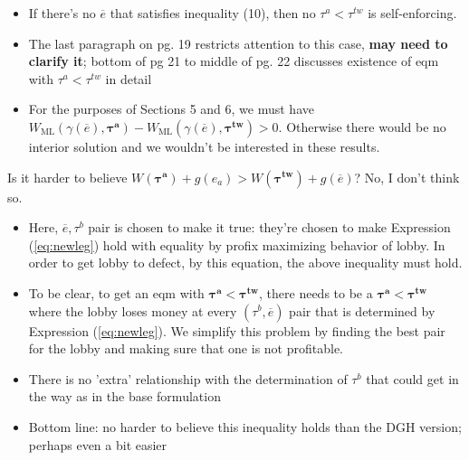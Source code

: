 \documentclass[12pt]{article}
\newcommand{\ov}{\overline}
\newcommand{\bta}{\bm{\tau^a}}
\newcommand{\btw}{\bm{\tau^{tw}}}
\newcommand{\ga}{\gamma}
\begin{document}
\begin{itemize}
\begin{itemize}
\begin{itemize}
					\item If there's no $\ov{e}$ that satisfies inequality (10), then no $\tau^a < \tau^{tw}$ is self-enforcing.
					\item The last paragraph on pg. 19 restricts attention to this case, \textbf{may need to clarify it}; bottom of pg 21 to middle of pg. 22 discusses existence of eqm with $\tau^a < \tau^{tw}$ in detail
					\item For the purposes of Sections 5 and 6, we must have $W_\text{ML}(\ga(\ov{e}),\bta) - W_\text{ML}(\ga(\ov{e}),\btw) > 0$. Otherwise there would be no interior solution and we wouldn't be interested in these results.
				\end{itemize}
			Is it harder to believe $W(\bta) +g(e_a) > W(\btw) + g(\ov{e})$? No, I don't think so.
				\begin{itemize}
					\item Here, $\ov{e}, \tau^b$ pair is chosen to make it true: they're chosen to make Expression (\ref{eq:newleg}) hold with equality by profix maximizing behavior of lobby. In order to get lobby to defect, by this equation, the above inequality must hold.
					\item To be clear, to get an eqm with $\bta < \btw$, there needs to be a $\bta < \btw$ where the lobby loses money at every $\left(\tau^b,\ov{e}\right)$ pair that is determined by Expression (\ref{eq:newleg}). We simplify this problem by finding the best pair for the lobby and making sure that one is not profitable.
					\item There is no 'extra' relationship with the determination of $\tau^b$ that could get in the way as in the base formulation
					\item Bottom line: no harder to believe this inequality holds than the DGH version; perhaps even a bit easier
				\end{itemize}
		\end{itemize}
\end{itemize}
\end{document}
